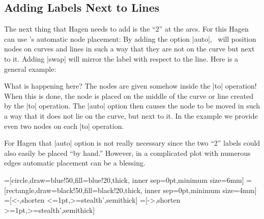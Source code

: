 \subsection{Adding Labels Next to Lines}

The next thing that Hagen needs to add is the ``$2$'' at the arcs. For
this Hagen can use \tikzname's automatic node placement: By adding the
option |auto|, \tikzname\ will position nodes on curves and lines in
such a way that they are not on the curve but next to it. Adding
|swap| will mirror the label with respect to the line. Here is a
general example:

{
\begin{codeexample}[]
\end{codeexample}
}

What is happening here? The nodes are given somehow inside the |to|
operation! When this is done, the node is placed on the middle of the
curve or line created by the |to| operation. The |auto| option then
causes the node to be moved in such a way that it does not lie on the
curve, but next to it. In the example we provide even two nodes on
each |to| operation.

For Hagen that |auto| option is not really necessary since the two
``2'' labels could also easily be placed ``by hand.'' However, in a
complicated plot with numerous edges automatic placement can be a
blessing. 

{
=[circle,draw=blue!50,fill=blue!20,thick,
                   inner sep=0pt,minimum size=6mm]
=[rectangle,draw=black!50,fill=black!20,thick,
                        inner sep=0pt,minimum size=4mm]
=[<-,shorten <=1pt,>=stealth',semithick]  
=[->,shorten >=1pt,>=stealth',semithick]  
\begin{codeexample}[]
\end{codeexample}
}



